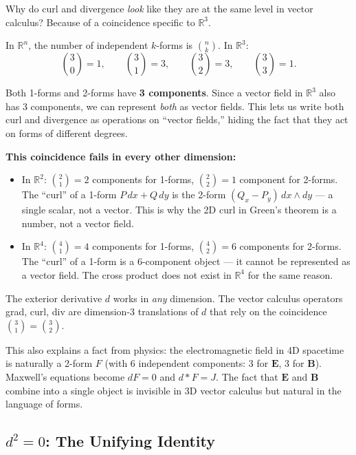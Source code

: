\documentclass[11pt]{report}
\newcommand{\R}{\mathbb{R}}
\begin{document}
\begin{remark}[The $\R^3$ Accident]
Why do curl and divergence \textit{look} like they are at the same level in vector calculus? Because of a coincidence specific to $\R^3$.

In $\R^n$, the number of independent $k$-forms is $\binom{n}{k}$. In $\R^3$:
\[
\binom{3}{0} = 1, \qquad \binom{3}{1} = 3, \qquad \binom{3}{2} = 3, \qquad \binom{3}{3} = 1.
\]

Both 1-forms and 2-forms have \textbf{3 components}. Since a vector field in $\R^3$ also has 3 components, we can represent \textit{both} as vector fields. This lets us write both curl and divergence as operations on ``vector fields,'' hiding the fact that they act on forms of different degrees.

\textbf{This coincidence fails in every other dimension:}
\begin{itemize}
    \item In $\R^2$: $\binom{2}{1} = 2$ components for 1-forms, $\binom{2}{2} = 1$ component for 2-forms. The ``curl'' of a 1-form $P\,dx + Q\,dy$ is the 2-form $(Q_x - P_y)\,dx \wedge dy$ --- a single scalar, not a vector. This is why the 2D curl in Green's theorem is a number, not a vector field.
    \item In $\R^4$: $\binom{4}{1} = 4$ components for 1-forms, $\binom{4}{2} = 6$ components for 2-forms. The ``curl'' of a 1-form is a 6-component object --- it cannot be represented as a vector field. The cross product does not exist in $\R^4$ for the same reason.
\end{itemize}

The exterior derivative $d$ works in \textit{any} dimension. The vector calculus operators grad, curl, div are dimension-3 translations of $d$ that rely on the coincidence $\binom{3}{1} = \binom{3}{2}$.

This also explains a fact from physics: the electromagnetic field in 4D spacetime is naturally a 2-form $F$ (with 6 independent components: 3 for $\mathbf{E}$, 3 for $\mathbf{B}$). Maxwell's equations become $dF = 0$ and $d{*}F = J$. The fact that $\mathbf{E}$ and $\mathbf{B}$ combine into a single object is invisible in 3D vector calculus but natural in the language of forms.
\end{remark}

\subsection{$d^2 = 0$: The Unifying Identity}
\end{document}
